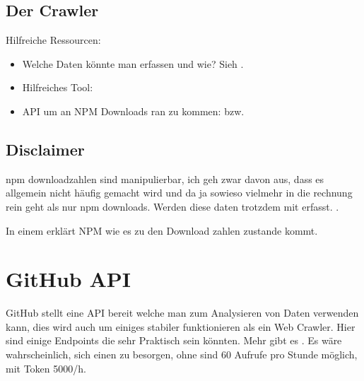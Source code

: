 


\subsection{Der Crawler}

Hilfreiche Ressourcen:

\begin{itemize}
    \item Welche Daten könnte man erfassen und wie? Sieh .
    \item Hilfreiches Tool: 
    \item API um an NPM Downloads ran zu kommen:
          bzw.
\end{itemize}



\subsection{Disclaimer}

npm downloadzahlen sind manipulierbar, ich geh zwar davon aus, dass es allgemein nicht häufig gemacht wird
und da ja sowieso vielmehr in die rechnung rein geht als nur npm downloads. Werden diese daten trotzdem mit erfasst.
.

In einem 
erklärt NPM wie es zu den Download zahlen zustande kommt.


\section{GitHub API}
GitHub stellt eine API bereit welche man zum Analysieren von Daten verwenden kann, dies wird auch um
einiges stabiler funktionieren als ein Web Crawler. Hier sind einige Endpoints die sehr Praktisch sein könnten.
Mehr gibt es . Es wäre wahrscheinlich, sich
einen 
zu besorgen, ohne sind 60 Aufrufe pro Stunde möglich, mit Token 5000/h.

